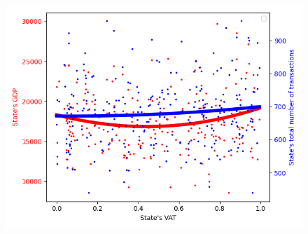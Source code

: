         \begin{figure}
            \includegraphics[width=\linewidth]{img/exp/2_1.png}
        \end{figure} 
